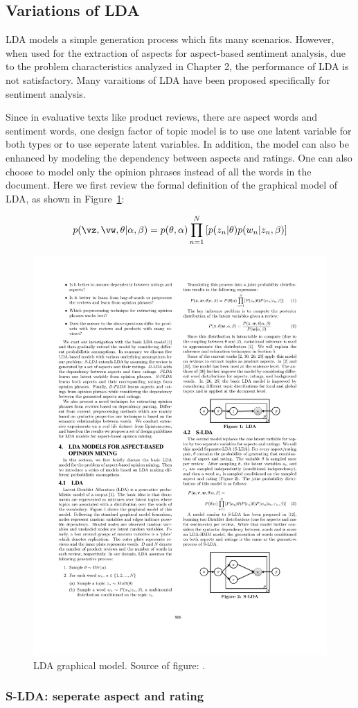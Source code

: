 \subsection{Variations of LDA}

LDA models a simple generation process which fits many scenarios. However, when used for the extraction of aspects for aspect-based sentiment analysis, due to the problem characteristics analyzed in Chapter 2, the performance of LDA is not satisfactory. Many varaitions of LDA have been proposed specifically for sentiment analysis.

Since in evaluative texts like product reviews, there are aspect words and sentiment words, one design factor of topic model is to use one latent variable for both types or to use seperate latent variables. In addition, the model can also be enhanced by modeling the dependency between aspects and ratings. One can also choose to model only the opinion phrases instead of all the words in the document. Here we first review the formal definition of the graphical model of LDA, as shown in Figure~\ref{fig:methods:LDA_1}:

$$p(\vz, \vw, \theta | \alpha, \beta) = p(\theta, \alpha) \prod_{n=1}^N \left[ 
p(z_n| \theta) p(w_n | z_n, \beta)\right]$$

\begin{figure}
\centering
\includegraphics[width=0.5\columnwidth]{figures/methods/LDA_1}
\caption{LDA graphical model. Source of figure: \cite{moghaddam2012design}.}
\label{fig:methods:LDA_1}
\end{figure}

\subsubsection{S-LDA: seperate aspect and rating}

